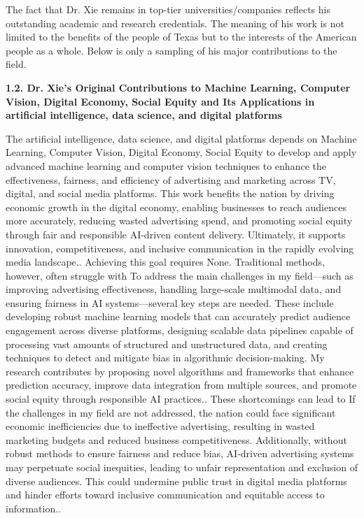\documentclass{article}
\begin{document}
The fact that Dr. Xie remains in top-tier universities/companies reflects his outstanding academic and research credentials. The meaning of his work is not limited to the benefits of the people of Texas but to the interests of the American people as a whole. Below is only a sampling of his major contributions to the field.



{\bf 1.2. Dr. Xie's Original Contributions to Machine Learning, Computer Vision, Digital Economy, Social Equity and Its Applications in  artificial intelligence, data science, and digital platforms }

The  artificial intelligence, data science, and digital platforms  depends on Machine Learning, Computer Vision, Digital Economy, Social Equity to develop and apply advanced machine learning and computer vision techniques to enhance the effectiveness, fairness, and efficiency of advertising and marketing across TV, digital, and social media platforms. This work benefits the nation by driving economic growth in the digital economy, enabling businesses to reach audiences more accurately, reducing wasted advertising spend, and promoting social equity through fair and responsible AI-driven content delivery. Ultimately, it supports innovation, competitiveness, and inclusive communication in the rapidly evolving media landscape.. Achieving this goal requires None. Traditional methods, however, often struggle with To address the main challenges in my field—such as improving advertising effectiveness, handling large-scale multimodal data, and ensuring fairness in AI systems—several key steps are needed. These include developing robust machine learning models that can accurately predict audience engagement across diverse platforms, designing scalable data pipelines capable of processing vast amounts of structured and unstructured data, and creating techniques to detect and mitigate bias in algorithmic decision-making. My research contributes by proposing novel algorithms and frameworks that enhance prediction accuracy, improve data integration from multiple sources, and promote social equity through responsible AI practices.. These shortcomings can lead to If the challenges in my field are not addressed, the nation could face significant economic inefficiencies due to ineffective advertising, resulting in wasted marketing budgets and reduced business competitiveness. Additionally, without robust methods to ensure fairness and reduce bias, AI-driven advertising systems may perpetuate social inequities, leading to unfair representation and exclusion of diverse audiences. This could undermine public trust in digital media platforms and hinder efforts toward inclusive communication and equitable access to information..
\end{document}
